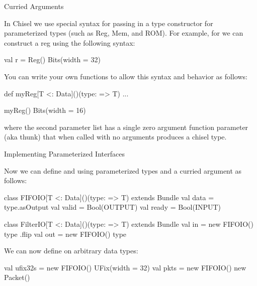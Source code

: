 \documentclass[xcolor=pdflatex,dvipsnames,table]{beamer}
\begin{document}
\begin{frame}[fragile]{Curried Arguments}

In Chisel we use special syntax for passing in a type constructor for parameterized types (such as Reg, Mem, and ROM).  For example, for we can construct a reg using the following syntax:
\begin{scala}
val r = Reg(){ Bits(width = 32) }
\end{scala}

You can write your own functions to allow this syntax and behavior as follows:

\begin{scala}
def myReg[T <: Data]()(type: => T) { ... }

myReg(){ Bits(width = 16) }
\end{scala}

\noindent
where the second parameter list has a single zero argument function parameter (aka thunk) that when called with no arguments produces a chisel type.

\end{frame}

\begin{frame}[fragile]{Implementing Parameterized Interfaces}

Now we can define  and  using parameterized types and a curried argument as follows:

{
\begin{scala}
class FIFOIO[T <: Data]()(type: => T) extends Bundle {
  val data  = type.asOutput
  val valid = Bool(OUTPUT)
  val ready = Bool(INPUT)
}

class FilterIO[T <: Data]()(type: => T) extends Bundle { 
  val in  = new FIFOIO(){ type }.flip
  val out = new FIFOIO(){ type }
}
\end{scala}

\noindent
We can now define  on arbitrary data types:

\begin{scala}
val ufix32s = new FIFOIO(){ UFix(width = 32) }
val pkts    = new FIFOIO(){ new Packet() }
\end{scala}
}
\end{frame}
\end{document}
